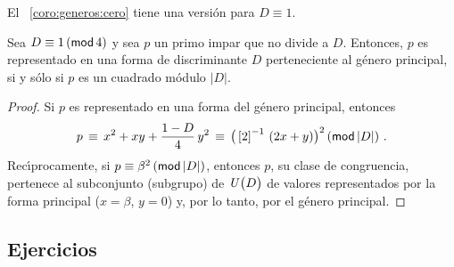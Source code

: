 El \coroname~\ref{coro:generos:cero} tiene una versi\'on para $D\equiv 1$.

\begin{coroGenerosB}\label{coro:generos:uno}
	Sea $D\equiv 1\tmodulo[4]$ y sea $p$ un primo impar
	que no divide a $D$. Entonces, $p$ es representado en una
	forma de discriminante $D$ perteneciente al g\'enero principal,
	si y s\'olo si $p$ es un cuadrado m\'odulo $|D|$.
\end{coroGenerosB}

\begin{proof}
	Si $p$ es representado en una forma del g\'enero principal,
	entonces
	\begin{displaymath}
		p\,\equiv\,x^2+xy+\frac{1-D} 4\,y^2
			\,\equiv\,\big(\clase 2^{-1}\,(2x+y)\big)^2
			\tmodulo[|D|]
		\dispstop
	\end{displaymath}
	Rec\'{\i}procamente, si $p\equiv\beta^2\tmodulo[|D|]$,
	entonces $p$, su clase de congruencia,
	pertenece al subconjunto (subgrupo) de $\Unidadesmod[D]$
	de valores representados por la forma principal
	($x=\beta$, $y=0$) y, por lo tanto, por el g\'enero principal.
\end{proof}

\subsection*{Ejercicios}


